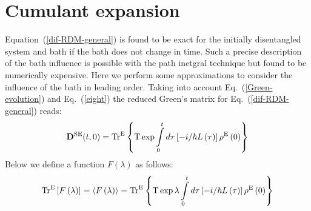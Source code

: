 \documentclass[12pt,twoside,a4paper]{report}
\begin{document}
\section{Cumulant expansion}\label{com-exp}
Equation~(\ref{dif-RDM-general}) is found to be exact 
for the initially disentangled 
system and bath 
if
the  bath does not change 
in time.
Such a precise description of the  bath influence is possible with 
the path inetgral technique \cite{domcke} but 
found to be numerically expensive.
Here we perform some approximations to consider the influence
 of the bath in leading order.
Taking into account
Eq.~(\ref{Green-evolution}) and Eq.~(\ref{eight}) 
the reduced Green's matrix for Eq.~(\ref{dif-RDM-general}) reads:  
\begin{equation} 
\mathbf{D}
^{\rm SE}
 {\left( 
       t,0
  \right) }
             =
                 {\rm Tr}^{\rm E}
                 \left\{ 
                     {\rm T}
                      \exp 
                      \int\limits_0^t d\tau 
                      \left[
                          -i/\hbar L\left( \tau \right) 
                      \right] 
                      \rho^{\rm E}\left( 0\right) 
                 \right\}  \label{15} 
\end{equation} 
Below we define a function $F\left(\lambda\right)$ as follows:
\begin{equation} 
{\rm Tr}^{\rm E}
\left[
    F
    \left( 
        \mathbf
        {\lambda }
    \right) 
\right]              =
                         \left\langle 
                              F
                               \left(  
                                   \mathbf
                                   {\lambda }
                               \right) 
                         \right\rangle
                    =
                         {\rm Tr}^{\rm E}
                          \left\{
                              {\rm T}
                              \exp 
                              \mathbf
                                 {\lambda}
                              \int\limits_0^t d\tau 
                              \left[ 
                                 -  i/\hbar L\left( \tau \right) 
                              \right] 
                              \rho^{\rm E}\left( 0\right) 
                          \right\} \label{16} 
\end{equation} 
\end{document}

